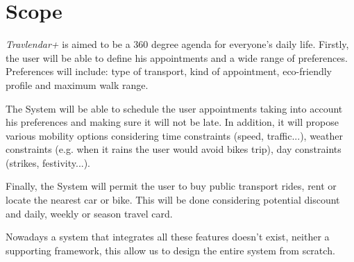 \section{Scope}

\emph{Travlendar+} is aimed to be a 360 degree agenda for everyone's daily life.
Firstly, the user will be able to define his appointments and a wide range of preferences. Preferences will include: type of transport, kind of appointment, eco-friendly profile and maximum walk range.

The System will be able to schedule the user appointments taking into account his preferences and making sure it will not be late. In addition, it will propose various mobility options considering time constraints (speed, traffic...), weather constraints (e.g. when it rains the user would avoid bikes trip), day constraints (strikes, festivity...). 

Finally, the System will permit the user to buy public transport rides, rent or locate the nearest car or bike. This will be done considering potential discount and daily, weekly or season travel card.

Nowadays a system that integrates all these features doesn't exist, neither a supporting framework, this allow us to design the entire system from scratch.  